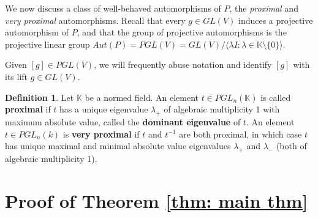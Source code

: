 \documentclass[12pt]{article}
\theoremstyle{definition}
\newtheorem{defn}[thm]{Definition}
\newcommand{\K}{\mathbb{K}}
\begin{document}
We now discuss a class of well-behaved automorphisms of $P$, the \emph{proximal} and \emph{very proximal} automorphisms. Recall that every $g \in GL(V)$ induces a projective automorphism of $P$, and that the group of projective automorphisms is the projective linear group $Aut(P) = PGL(V) = GL(V) / \langle \lambda I : \lambda \in \K\setminus \{0\}\rangle$. 

Given $[g] \in PGL(V)$, we will frequently abuse notation and identify $[g]$ with its lift $g \in GL(V)$. 

\begin{defn}
    Let $\K$ be a normed field. An element $t \in PGL_n(\K)$ is called \textbf{proximal} if $t$ has a unique eigenvalue $\lambda_+$ of algebraic multiplicity 1 with maximum absolute value, called the \textbf{dominant eigenvalue} of $t$. An element $t \in PGL_n(k)$ is \textbf{very proximal} if $t$ and $t^{-1}$ are both proximal, in which case $t$ has unique maximal and minimal absolute value eigenvalues $\lambda_+$ and $\lambda_-$ (both of algebraic multiplicity 1).  
\end{defn}







\section{Proof of Theorem \ref{thm: main thm}}
\label{sec: proof of main theorem}
\end{document}
